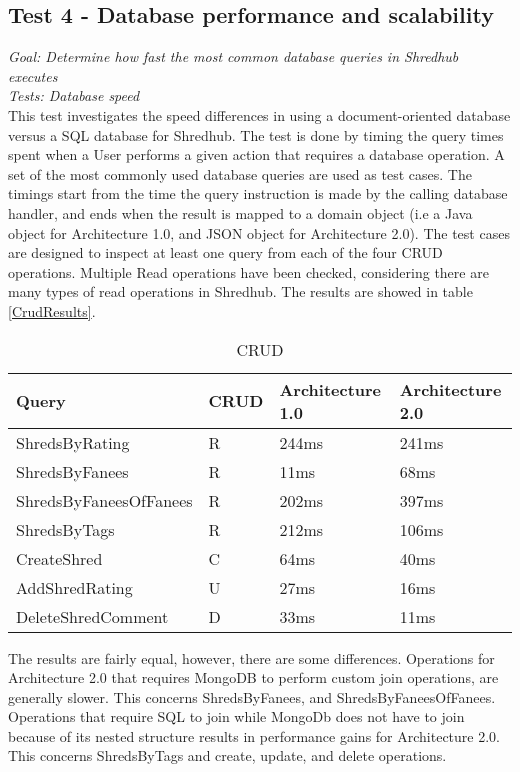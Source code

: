 %

\subsection{Test 4 - Database performance and scalability}
\textit{Goal: Determine how fast the most common database queries in Shredhub executes}\\
\textit{Tests: Database speed}\\
This test investigates the speed differences in using a document-oriented database versus a SQL database for Shredhub. The test is done by timing the query times spent when a User performs a given action that requires a database operation. A set of the most commonly used database queries are used as test cases. The timings start from the time the query instruction is made by the calling database handler, and ends when the result is mapped to a domain object (i.e a Java object for Architecture 1.0, and JSON object for Architecture 2.0). The test cases are designed to inspect at least one query from each of the four CRUD operations. Multiple Read operations have been checked, considering there are many types of read operations in Shredhub. The results are showed in table \vref{CrudResults}. 
\begin{table}
\begin{center}
    \begin{tabular}{| l | l | l | l |}
    \hline
	Query & CRUD & Architecture 1.0  & Architecture 2.0 \\ \hline
	ShredsByRating & R & 244ms & 241ms \\ \hline
	ShredsByFanees & R & 11ms & 68ms \\ \hline
	ShredsByFaneesOfFanees & R & 202ms & 397ms \\ \hline
       ShredsByTags & R & 212ms & 106ms \\ \hline
	CreateShred & C & 64ms & 40ms \\ \hline
	AddShredRating & U & 27ms & 16ms \\ \hline
       DeleteShredComment & D & 33ms & 11ms \\ \hline
    \end{tabular}
    	\label{CrudResults}
        \caption{CRUD }
\end{center}
\end{table}
The results are fairly equal, however, there are some differences. Operations for Architecture 2.0 that requires MongoDB to perform custom join operations, are generally slower. This concerns ShredsByFanees, and ShredsByFaneesOfFanees. Operations that require SQL to join while MongoDb does not have to join because of its nested structure results in performance gains for Architecture 2.0. This concerns ShredsByTags and create, update, and delete operations. 



